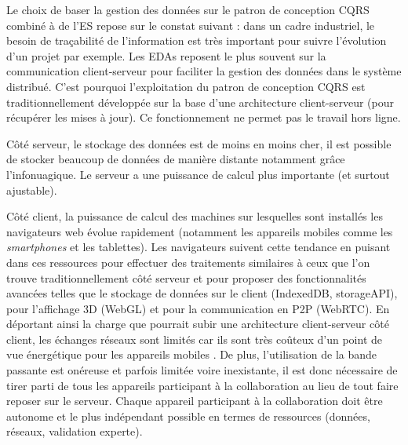 %

Le choix de baser la gestion des données sur le patron de conception \gls{CQRS} 
combiné à de l'\gls{ES} repose sur le constat suivant : dans un cadre industriel, le 
besoin de traçabilité de l'information est très important pour suivre l'évolution d'un 
projet par exemple. 
Les \glspl{EDA} reposent le plus souvent sur 
la communication client-serveur pour faciliter la gestion des données dans le 
système distribué. C'est pourquoi l'exploitation du patron de conception 
\gls{CQRS} est traditionnellement développée sur la base d'une architecture client-serveur  (pour récupérer les mises à jour). 
Ce fonctionnement ne permet pas le travail hors ligne.

Côté serveur, le stockage des données est de moins en moins cher, il est possible de stocker beaucoup de données de manière distante notamment 
grâce l'infonuagique. Le serveur a une puissance de calcul 
plus importante (et surtout ajustable).

Côté client, la puissance de calcul des machines sur lesquelles sont installés les 
navigateurs web évolue rapidement (notamment les appareils mobiles comme les 
\textit{smartphones} et les tablettes). Les navigateurs suivent cette tendance en 
puisant dans ces ressources pour effectuer des traitements similaires à ceux que 
l'on trouve traditionnellement côté serveur et pour proposer des fonctionnalités 
avancées telles que le stockage de données sur le client (IndexedDB, 
storageAPI), pour l'affichage 3D (WebGL) et pour la communication en \gls{P2P} 
(\gls{WebRTC}). En déportant ainsi la charge que pourrait subir une architecture 
client-serveur côté client, les échanges réseaux sont limités car ils 
sont très coûteux d'un point de vue énergétique pour les appareils mobiles 
\cite{Koskela2015}. De plus, l'utilisation de la bande passante est onéreuse et 
parfois limitée voire inexistante, il est donc nécessaire de tirer parti de tous les 
appareils participant à la collaboration au lieu de tout faire reposer sur le serveur. 
Chaque appareil participant à la collaboration doit être autonome et le plus 
indépendant possible en termes de ressources (données, réseaux, validation 
experte). 

